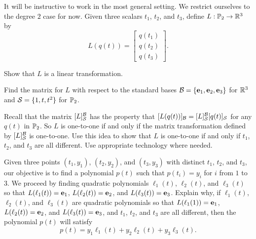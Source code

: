 \begin{pactivity} \label{act:SSS_1}  It will be instructive to work in the most general setting. We restrict ourselves to the degree $2$ case for now. Given three scalars $t_1$, $t_2$, and $t_3$, define $L: \mathbb{P}_2 \to \mathbb{R}^3$ by 
\[L(q(t)) = \left[ \begin{array}{c} q(t_1) \\  q(t_2) \\ q(t_3) \end{array} \right].\] 
	\ba
	\item Show that $L$ is a linear transformation.

	\item Find the matrix for $L$ with respect to the standard bases $\mathcal{B} = \{\mathbf{e}_1, \mathbf{e}_2, \mathbf{e}_3\}$ for $\mathbb{R}^3$ and $\mathcal{S} = \{1,t,t^2\}$ for $\mathbb{P}_2$.  

	\item Recall that the matrix $[L]_{\mathcal{S}}^{\mathcal{B}}$ has the property that $[L(q(t))]_{\mathcal{B}} = [L]_{\mathcal{S}}^{\mathcal{B}}[q(t)]_{\mathcal{S}}$ for any $q(t)$ in $\mathbb{P}_2$. So $L$ is one-to-one if and only if the matrix transformation defined by $[L]_{\mathcal{S}}^{\mathcal{B}}$ is one-to-one. Use this idea to show that $L$ is one-to-one if and only if $t_1$, $t_2$, and $t_3$ are all different. Use appropriate technology where needed.

	
	\item Given three points $(t_1,y_1)$,  $(t_2,y_2)$, and $(t_3,y_3)$ with distinct $t_1$, $t_2$, and $t_3$, our objective is to find a polynomial $p(t)$ such that $p(t_i) = y_i$ for $i$ from $1$ to $3$. We proceed by finding quadratic polynomials $\ell_1(t)$, $\ell_2(t)$, and $\ell_3(t)$ so that $L(\ell_1(t)) =  \mathbf{e}_1$, $L(\ell_2(t)) = \mathbf{e}_2$, and $L(\ell_3(t)) = \mathbf{e}_3$. Explain why, if $\ell_1(t)$, $\ell_2(t)$, and $\ell_3(t)$ are quadratic polynomials so that $L(\ell_1(1)) =  \mathbf{e}_1$, $L(\ell_2(t)) = \mathbf{e}_2$, and $L(\ell_3(t)) = \mathbf{e}_3$, and $t_1$, $t_2$, and $t_3$ are all different, then the polynomial $p(t)$ will satisfy
\begin{equation} \label{eq:Lagrange_2} 
p(t) = y_1 \ell_1(t) + y_2 \ell_2(t) + y_3 \ell_3(t).
\end{equation} 

	
	\ea

\end{pactivity}


